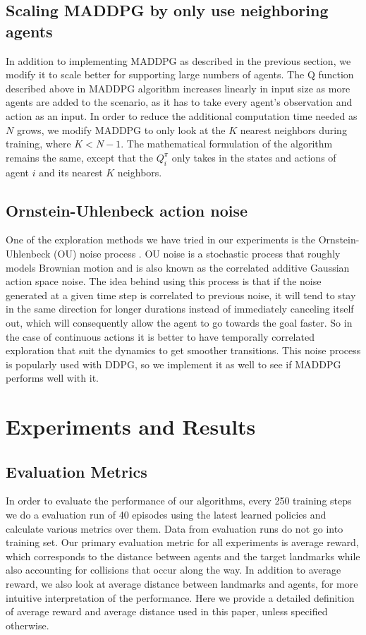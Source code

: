 \documentclass{article}
\begin{document}
\subsection{Scaling MADDPG by only use neighboring agents}
In addition to implementing MADDPG as described in the previous section, we modify it to scale better for supporting large numbers of agents. The Q function described above in MADDPG algorithm increases linearly in input size as more agents are added to the scenario, as it has to take every agent's observation and action as an input. In order to reduce the additional computation time needed as $N$ grows, we modify MADDPG to only look at the $K$ nearest neighbors during training, where $K < N-1$. The mathematical formulation of the algorithm remains the same, except that the $Q^\pi_i$ only takes in the states and actions of agent $i$ and its nearest $K$ neighbors.

\subsection{Ornstein-Uhlenbeck action noise}
One of the exploration methods we have tried in our experiments is the Ornstein-Uhlenbeck (OU) noise process \cite{ou}. OU noise is a stochastic process that roughly models Brownian motion and is also known as the correlated additive Gaussian action space noise. The idea behind using this process is that if the noise generated at a given time step is correlated to previous noise, it will tend to stay in the same direction for longer durations instead of immediately canceling itself out, which will consequently allow the agent to go towards the goal faster. So in the case of continuous actions it is better to have temporally correlated exploration that suit the dynamics to get smoother transitions. This noise process is popularly used with DDPG, so we implement it as well to see if MADDPG performs well with it.

\section{Experiments and Results}
\subsection{Evaluation Metrics}

In order to evaluate the performance of our algorithms, every 250 training steps we do a evaluation run of 40 episodes using the latest learned policies and calculate various metrics over them. Data from evaluation runs do not go into training set. Our primary evaluation metric for all experiments is average reward, which corresponds to the distance between agents and the target landmarks while also accounting for collisions that occur along the way. In addition to average reward, we also look at average distance between landmarks and agents, for more intuitive interpretation of the performance. Here we provide a detailed definition of average reward and average distance used in this paper, unless specified otherwise.
\end{document}
